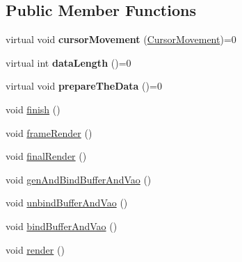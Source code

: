\subsection*{Public Member Functions}
\begin{DoxyCompactItemize}
\item 
virtual void {\bfseries cursor\+Movement} (\hyperlink{classCursorMovement}{Cursor\+Movement})=0\hypertarget{classShape_a0961d7281bca29285d6612b75bb157d9}{}\label{classShape_a0961d7281bca29285d6612b75bb157d9}

\item 
virtual int {\bfseries data\+Length} ()=0\hypertarget{classShape_a32cbd03b3856b47df4130bfe8146845b}{}\label{classShape_a32cbd03b3856b47df4130bfe8146845b}

\item 
virtual void {\bfseries prepare\+The\+Data} ()=0\hypertarget{classShape_a0a6013295cf3ca8f46616071fd758343}{}\label{classShape_a0a6013295cf3ca8f46616071fd758343}

\item 
void \hyperlink{classShape_a3651abfa2b1d449f35c83b3dc64f64f2}{finish} ()
\item 
void \hyperlink{classShape_a54656be292bf729d6ea90b06f5c7960e}{frame\+Render} ()
\item 
void \hyperlink{classShape_a00ca157cc139d7ba9259ba3e2967c908}{final\+Render} ()
\item 
void \hyperlink{classShape_a4802e77733cb6d47f7eb69fcb4fdf089}{gen\+And\+Bind\+Buffer\+And\+Vao} ()
\item 
void \hyperlink{classShape_a3a78a69fcfd3a2bc9f80ad5a00fdf669}{unbind\+Buffer\+And\+Vao} ()
\item 
void \hyperlink{classShape_aff33547fafee1a528cdee387c0fb54aa}{bind\+Buffer\+And\+Vao} ()
\item 
void \hyperlink{classShape_ad62ee6dbad795d967e2f572f6e4e27fb}{render} ()
\end{DoxyCompactItemize}
